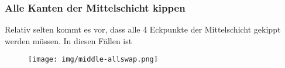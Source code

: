\documentclass[letterpaper,10pt,twoside,twocolumn,openany]{book}
\begin{document}
\subsubsection{Alle Kanten der Mittelschicht \newline kippen}
\begin{justify}
Relativ selten kommt es vor, dass alle 4 Eckpunkte der Mittelschicht gekippt werden müssen. In diesen Fällen ist 
\end{justify}
\begin{figure}[!htb] 
  \centering
     \texttt{[image: img/middle-allswap.png]}
\end{figure}


\end{document}
